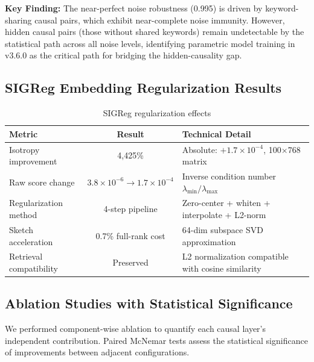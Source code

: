 \documentclass[11pt,a4paper]{article}
\begin{document}
\textbf{Key Finding:} The near-perfect noise robustness (0.995) is driven by keyword-sharing causal pairs, which exhibit near-complete noise immunity. However, hidden causal pairs (those without shared keywords) remain undetectable by the statistical path across all noise levels, identifying parametric model training in v3.6.0 as the critical path for bridging the hidden-causality gap.

\subsection{SIGReg Embedding Regularization Results}

\begin{table}[H]
\centering
\caption{SIGReg regularization effects}
\label{tab:sigreg}
\begin{tabular}{lcl}
\toprule
\textbf{Metric} & \textbf{Result} & \textbf{Technical Detail} \\
\midrule
Isotropy improvement    & 4,425\%          & Absolute: \(+1.7 \times 10^{-4}\), 100\(\times\)768 matrix \\
Raw score change        & \(3.8\times 10^{-6} \to 1.7\times 10^{-4}\) & Inverse condition number \(\lambda_{\min}/\lambda_{\max}\) \\
Regularization method   & 4-step pipeline  & Zero-center + whiten + interpolate + L2-norm \\
Sketch acceleration     & 0.7\% full-rank cost & 64-dim subspace SVD approximation \\
Retrieval compatibility & Preserved        & L2 normalization compatible with cosine similarity \\
\bottomrule
\end{tabular}
\end{table}

\subsection{Ablation Studies with Statistical Significance}

We performed component-wise ablation to quantify each causal layer's independent contribution. Paired McNemar tests assess the statistical significance of improvements between adjacent configurations.
\end{document}
